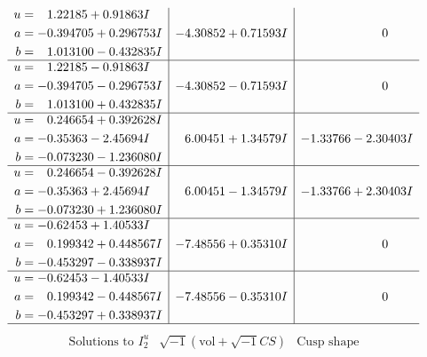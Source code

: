 \documentclass[1p]{elsarticle_modified}
\theoremstyle{definition}
\newcommand{\I}{\sqrt{-1}}
\begin{document}
$$\begin{array}{c|c|c}
\begin{aligned}
u &= \phantom{-}1.22185 + 0.91863 I \\
a &= -0.394705 + 0.296753 I \\
b &= \phantom{-}1.013100 - 0.432835 I\end{aligned}
 & -4.30852 + 0.71593 I & \phantom{-0.000000 } 0 \\ \hline\begin{aligned}
u &= \phantom{-}1.22185 - 0.91863 I \\
a &= -0.394705 - 0.296753 I \\
b &= \phantom{-}1.013100 + 0.432835 I\end{aligned}
 & -4.30852 - 0.71593 I & \phantom{-0.000000 } 0 \\ \hline\begin{aligned}
u &= \phantom{-}0.246654 + 0.392628 I \\
a &= -0.35363 - 2.45694 I \\
b &= -0.073230 - 1.236080 I\end{aligned}
 & \phantom{-}6.00451 + 1.34579 I & -1.33766 - 2.30403 I \\ \hline\begin{aligned}
u &= \phantom{-}0.246654 - 0.392628 I \\
a &= -0.35363 + 2.45694 I \\
b &= -0.073230 + 1.236080 I\end{aligned}
 & \phantom{-}6.00451 - 1.34579 I & -1.33766 + 2.30403 I \\ \hline\begin{aligned}
u &= -0.62453 + 1.40533 I \\
a &= \phantom{-}0.199342 + 0.448567 I \\
b &= -0.453297 - 0.338937 I\end{aligned}
 & -7.48556 + 0.35310 I & \phantom{-0.000000 } 0 \\ \hline\begin{aligned}
u &= -0.62453 - 1.40533 I \\
a &= \phantom{-}0.199342 - 0.448567 I \\
b &= -0.453297 + 0.338937 I\end{aligned}
 & -7.48556 - 0.35310 I & \phantom{-0.000000 } 0\\
 \hline 
 \end{array}$$\newpage$$\begin{array}{c|c|c}  
\text{Solutions to }I^u_{2}& \I (\text{vol} + \sqrt{-1}CS) & \text{Cusp shape}\\
 \hline 
\begin{aligned}

\end{aligned}
\end{array}$$
\end{document}
